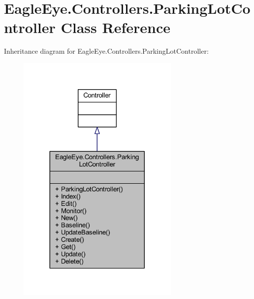 \hypertarget{class_eagle_eye_1_1_controllers_1_1_parking_lot_controller}{}\section{Eagle\+Eye.\+Controllers.\+Parking\+Lot\+Controller Class Reference}
\label{class_eagle_eye_1_1_controllers_1_1_parking_lot_controller}


Inheritance diagram for Eagle\+Eye.\+Controllers.\+Parking\+Lot\+Controller\+:
\nopagebreak
\begin{figure}[H]
\begin{center}
\leavevmode
\includegraphics[width=224pt]{class_eagle_eye_1_1_controllers_1_1_parking_lot_controller__inherit__graph}
\end{center}
\end{figure}


